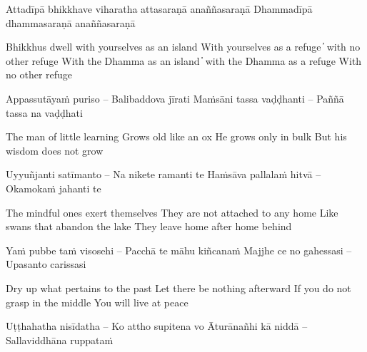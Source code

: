 \begin{twochants}
Attadīpā bhikkhave viharatha attasaraṇā anaññasaraṇā
Dhammadīpā dhammasaraṇā anaññasaraṇā
\end{twochants}

\begin{english}
Bhikkhus dwell with yourselves as an island
With yourselves as a refuge  ̓  with no other refuge
With the Dhamma as an island  ̓  with the Dhamma as a refuge
With no other refuge
\end{english}


\begin{twochants}
Appassutāyaṁ puriso – Balibaddova jīrati
Maṁsāni tassa vaḍḍhanti – Paññā tassa na vaḍḍhati
\end{twochants}

\begin{english}
The man of little learning
Grows old like an ox
He grows only in bulk
But his wisdom does not grow
\end{english}


\begin{twochants}
Uyyuñjanti satīmanto – Na nikete ramanti te
Haṁsāva pallalaṁ hitvā – Okamokaṁ jahanti te
\end{twochants}

\begin{english}
The mindful ones exert themselves
They are not attached to any home
Like swans that abandon the lake
They leave home after home behind
\end{english}


\begin{twochants}
Yaṁ pubbe taṁ visosehi – Pacchā te māhu kiñcanaṁ
Majjhe ce no gahessasi – Upasanto carissasi
\end{twochants}

\begin{english}
Dry up what pertains to the past
Let there be nothing afterward
If you do not grasp in the middle
You will live at peace
\end{english}


\begin{twochants}
Uṭṭhahatha nisīdatha – Ko attho supitena vo
Āturānañhi kā niddā – Sallaviddhāna ruppataṁ
\end{twochants}

